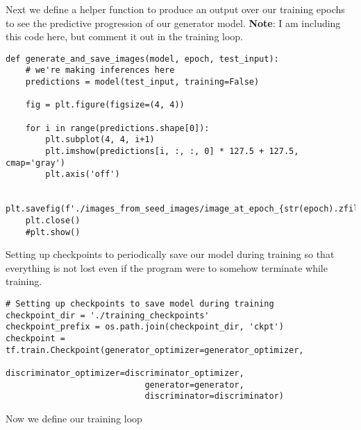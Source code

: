 \documentclass[%
oneside,                 %
final,                   %
10pt]{article}
\begin{document}
Next we define a helper function to produce an output over our training epochs
to see the predictive progression of our generator model. \textbf{Note}: I am including
this code here, but comment it out in the training loop.















\begin{verbatim}
def generate_and_save_images(model, epoch, test_input):
    # we're making inferences here
    predictions = model(test_input, training=False)

    fig = plt.figure(figsize=(4, 4))

    for i in range(predictions.shape[0]):
        plt.subplot(4, 4, i+1)
        plt.imshow(predictions[i, :, :, 0] * 127.5 + 127.5, cmap='gray')
        plt.axis('off')

    plt.savefig(f'./images_from_seed_images/image_at_epoch_{str(epoch).zfill(3)}.png')
    plt.close()
    #plt.show()

\end{verbatim}


Setting up checkpoints to periodically save our model during training so that
everything is not lost even if the program were to somehow terminate while
training.









\begin{verbatim}
# Setting up checkpoints to save model during training
checkpoint_dir = './training_checkpoints'
checkpoint_prefix = os.path.join(checkpoint_dir, 'ckpt')
checkpoint = tf.train.Checkpoint(generator_optimizer=generator_optimizer,
                            discriminator_optimizer=discriminator_optimizer,
                            generator=generator,
                            discriminator=discriminator)

\end{verbatim}


Now we define our training loop
\end{document}
